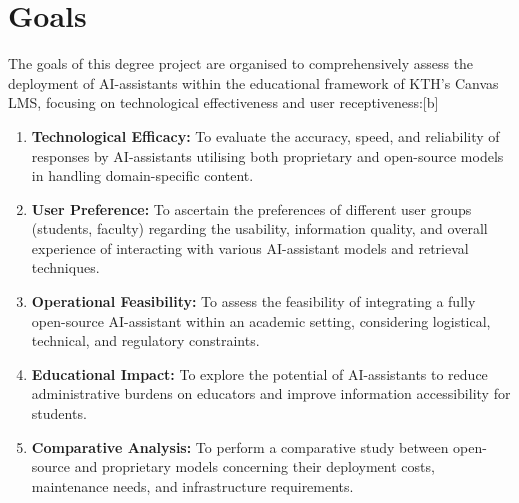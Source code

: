\section{Goals}
\label{sec:goals}








The goals of this degree project are organised to comprehensively assess the deployment of AI-assistants within the educational framework of KTH's Canvas LMS, focusing on technological effectiveness and user receptiveness:[b]


\begin{enumerate}
        \item \textbf{Technological Efficacy:} To evaluate the accuracy, speed, and reliability of responses by AI-assistants utilising both proprietary and open-source models in handling domain-specific content.
        \item \textbf{User Preference:} To ascertain the preferences of different user groups (students, faculty) regarding the usability, information quality, and overall experience of interacting with various AI-assistant models and retrieval techniques.
        \item \textbf{Operational Feasibility:} To assess the feasibility of integrating a fully open-source AI-assistant within an academic setting, considering logistical, technical, and regulatory constraints.
        \item \textbf{Educational Impact:} To explore the potential of AI-assistants to reduce administrative burdens on educators and improve information accessibility for students.
        \item \textbf{Comparative Analysis:} To perform a comparative study between open-source and proprietary models concerning their deployment costs, maintenance needs, and infrastructure requirements.
\end{enumerate}


